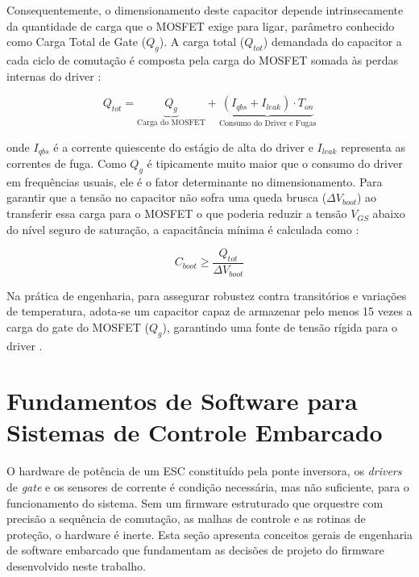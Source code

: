 Consequentemente, o dimensionamento deste capacitor depende intrinsecamente da quantidade de carga que o MOSFET exige para ligar, parâmetro conhecido como Carga Total de Gate ($Q_g$). A carga total ($Q_{tot}$) demandada do capacitor a cada ciclo de comutação é composta pela carga do MOSFET somada às perdas internas do driver \cite{infineonAN978}:

\begin{equation}
    Q_{tot} = \underbrace{Q_g}_{\text{Carga do MOSFET}} + \underbrace{(I_{qbs} + I_{leak}) \cdot T_{on}}_{\text{Consumo do Driver e Fugas}}
\end{equation}

\noindent onde $I_{qbs}$ é a corrente quiescente do estágio de alta do driver e $I_{leak}$ representa as correntes de fuga. Como $Q_g$ é tipicamente muito maior que o consumo do driver em frequências usuais, ele é o fator determinante no dimensionamento. Para garantir que a tensão no capacitor não sofra uma queda brusca ($\Delta V_{boot}$) ao transferir essa carga para o MOSFET o que poderia reduzir a tensão $V_{GS}$ abaixo do nível seguro de saturação, a capacitância mínima é calculada como \cite{infineonAN978}:

\begin{equation}
    C_{boot} \geq \frac{Q_{tot}}{\Delta V_{boot}}
\end{equation}

Na prática de engenharia, para assegurar robustez contra transitórios e variações de temperatura, adota-se um capacitor capaz de armazenar pelo menos 15 vezes a carga do gate do MOSFET ($Q_g$), garantindo uma fonte de tensão rígida para o driver \cite{adamsDT98}.

\section{Fundamentos de Software para Sistemas de Controle Embarcado}
\label{sec:fundamentos_software}

O hardware de potência de um ESC constituído pela ponte inversora, os \textit{drivers} de \textit{gate} e os sensores de corrente é condição necessária, mas não suficiente, para o funcionamento do sistema. Sem um firmware estruturado que orquestre com precisão a sequência de comutação, as malhas de controle e as rotinas de proteção, o hardware é inerte. Esta seção apresenta conceitos gerais de engenharia de software embarcado que fundamentam as decisões de projeto do firmware desenvolvido neste trabalho.

